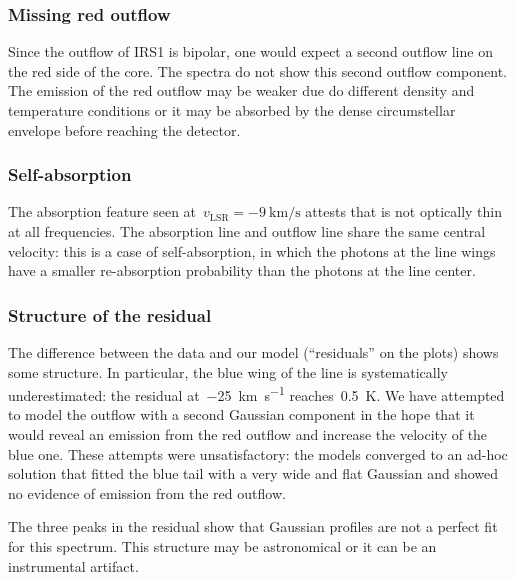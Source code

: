 \subsubsection{Missing red outflow}
Since the outflow of IRS1 is bipolar, one would expect a second outflow line on the red side of the core.
The spectra do not show this second outflow component.
The emission of the red outflow
may be weaker due do different density and temperature conditions
or it may be absorbed by the dense circumstellar envelope before reaching the detector.

\subsubsection{Self-absorption}
The absorption feature seen at~$v_\text{LSR}=\SI{-9}{\kilo\meter\per\second}$ attests that  is not optically thin at all frequencies.
The absorption line and outflow line share the same central velocity:
this is a case of self-absorption, in which the photons at the line wings have a smaller re-absorption probability than the photons at the line center.

\subsubsection{Structure of the residual}
The difference between the data and our model (``residuals'' on the plots) shows some structure.
In particular, the blue wing of the line is systematically underestimated: the residual at~\SI{-25}{\kilo\meter\per\second} reaches~\SI{0.5}{\kelvin}.
We have attempted to model the outflow with a second Gaussian component in the hope that it would reveal an emission from the red outflow and increase the velocity of the blue one.
These attempts were unsatisfactory: the models converged to an ad-hoc solution that fitted the blue tail with a very wide and flat Gaussian and showed no evidence of emission from the red outflow.

The three peaks in the residual show that Gaussian profiles are not a perfect fit for this spectrum.
This structure may be astronomical or it can be an instrumental artifact.

